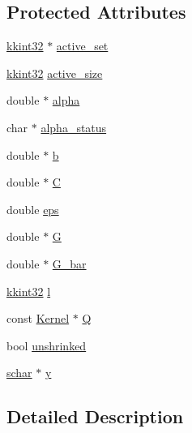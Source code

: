 \subsection*{Protected Attributes}
\begin{DoxyCompactItemize}
\item 
\hyperlink{namespace_k_k_b_a8fa4952cc84fda1de4bec1fbdd8d5b1b}{kkint32} $\ast$ \hyperlink{class_s_v_m233_1_1_solver_a19878aa39178001e48466e2562c72360}{active\+\_\+set}
\item 
\hyperlink{namespace_k_k_b_a8fa4952cc84fda1de4bec1fbdd8d5b1b}{kkint32} \hyperlink{class_s_v_m233_1_1_solver_aaa5d0e6b5e847cf0f05d5e5a44c96d1e}{active\+\_\+size}
\item 
double $\ast$ \hyperlink{class_s_v_m233_1_1_solver_ade1450d3dbc0633ad00958cf2b78eb0b}{alpha}
\item 
char $\ast$ \hyperlink{class_s_v_m233_1_1_solver_a53fe33a3d4e7904b9b26343eb3942309}{alpha\+\_\+status}
\item 
double $\ast$ \hyperlink{class_s_v_m233_1_1_solver_ae7665148726947abe81ad6e54fdfca14}{b}
\item 
double $\ast$ \hyperlink{class_s_v_m233_1_1_solver_ab02bb338fce4d113399e8cfc66588dac}{C}
\item 
double \hyperlink{class_s_v_m233_1_1_solver_a5332bb5b52696238e1a9e784e187a901}{eps}
\item 
double $\ast$ \hyperlink{class_s_v_m233_1_1_solver_a429fc1d5724c8e7547e02b74cac19f40}{G}
\item 
double $\ast$ \hyperlink{class_s_v_m233_1_1_solver_a10333392b693eae19adc14427c277036}{G\+\_\+bar}
\item 
\hyperlink{namespace_k_k_b_a8fa4952cc84fda1de4bec1fbdd8d5b1b}{kkint32} \hyperlink{class_s_v_m233_1_1_solver_a258ab441755a415c6b1f0b19f55f36fc}{l}
\item 
const \hyperlink{class_s_v_m233_1_1_kernel}{Kernel} $\ast$ \hyperlink{class_s_v_m233_1_1_solver_a09e21006f46841e5c9c6f97b87995743}{Q}
\item 
bool \hyperlink{class_s_v_m233_1_1_solver_a5cf7673b38cdd6d71056e904ec1cb6b9}{unshrinked}
\item 
\hyperlink{namespace_s_v_m233_afb4ec48497a25626275d52266ac9d7d8}{schar} $\ast$ \hyperlink{class_s_v_m233_1_1_solver_a17e4f05ccc46afc5b9bf686eac10928d}{y}
\end{DoxyCompactItemize}


\subsection{Detailed Description}



